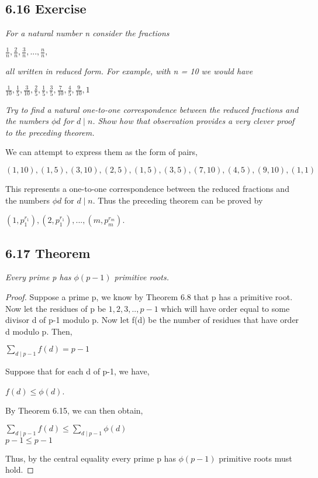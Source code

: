 \documentclass{article}
\begin{document}
\subsection*{6.16 Exercise} 
\quad \textit{For a natural number n consider the fractions}
\begin{center}
    $\frac{1}{n},\frac{2}{n},\frac{3}{n},...,\frac{n}{n},$
\end{center}
\textit{all written in reduced form. For example, with n = 10 we would have}
\begin{center}
    $\frac{1}{10},\frac{1}{5},\frac{3}{10},\frac{2}{5},\frac{1}{5},\frac{3}{5},\frac{7}{10},\frac{4}{5},\frac{9}{10},1$
\end{center}
\textit{Try to find a natural one-to-one correspondence between the reduced fractions and the numbers $\phi{d}$ for $d \mid n$. Show how that observation provides a very clever proof to the preceding theorem.}

We can attempt to express them as the form of pairs,
\begin{center}
    $(1,10), (1,5), (3,10), (2,5), (1,5), (3,5), (7,10), (4,5), (9,10), (1,1)$
\end{center}
This represents a one-to-one correspondence between the reduced fractions and the numbers $\phi{d}$ for $d \mid n$. Thus the preceding theorem can be proved by 
\begin{center}
    $(1,p_1^{r_1}), (2,p_1^{r_1}), ... , (m,p_m^{r_m})$.
\end{center}

\subsection*{6.17 Theorem} 
\quad \textit{Every prime p has $\phi(p-1)$ primitive roots.}

\begin{proof}
Suppose a prime p, we know by Theorem 6.8 that p has a primitive root. Now let the residues of p be $1,2,3,..,p-1$ which will have order equal to some divisor d of p-1 modulo p. Now let f(d) be the number of residues that have order d modulo p. Then,
\begin{center}
    $\sum_{d \mid p-1} f(d) = p-1$
\end{center}
Suppose that for each d of p-1, we have,
\begin{center}
    $f(d) \leq \phi(d)$.
\end{center}
By Theorem 6.15, we can then obtain,
\begin{center}
    $\sum_{d \mid p-1} f(d) \leq \sum_{d \mid p-1} \phi(d)$\\
    $p-1 \leq p-1$
\end{center}
Thus, by the central equality every prime p has $\phi(p-1)$ primitive roots must hold.
\end{proof}
\end{document}
